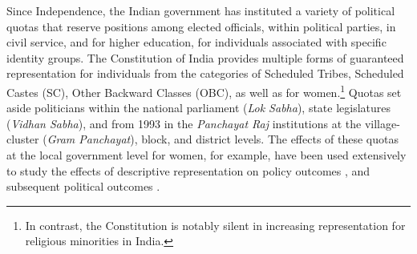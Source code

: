 \documentclass[12pt,reqno]{article}
\begin{document}
Since Independence, the Indian government has instituted a variety of political quotas that reserve positions among elected officials, within political parties, in civil service, and for higher education, for individuals associated with specific identity groups. The  Constitution of India provides multiple forms of guaranteed representation for individuals from the categories of Scheduled Tribes, Scheduled Castes (SC), Other Backward Classes (OBC), as well as for women.\footnote{In contrast, the Constitution is notably silent in increasing representation for religious minorities in India.} Quotas set aside politicians within the national parliament ({\it Lok Sabha}), state legislatures ({\it Vidhan Sabha}), and from 1993 in the \emph{Panchayat Raj} institutions at the village-cluster ({\it Gram Panchayat}), block, and district levels. The effects of these quotas at the local government level for women, for example, have been used extensively to study the effects of descriptive representation on policy outcomes \parencite{chattopadhyayWomenPolicyMakers2004}, and subsequent political outcomes \parencite{bhavnani2009electoral}.

\end{document}
